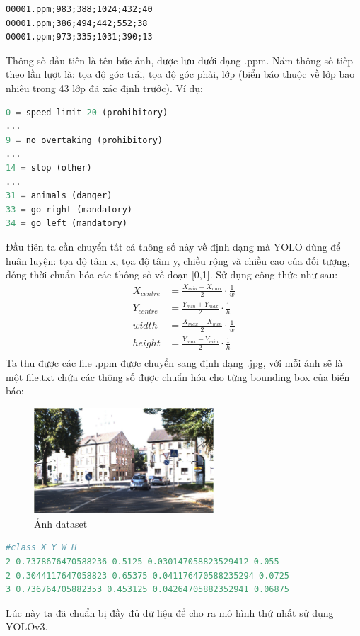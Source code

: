 \begin{lstlisting}
00001.ppm;983;388;1024;432;40
00001.ppm;386;494;442;552;38
00001.ppm;973;335;1031;390;13
\end{lstlisting}
Thông số đầu tiên là tên bức ảnh, được lưu dưới dạng .ppm. Năm thông số tiếp theo lần lượt là: tọa độ góc trái, tọa độ góc phải, lớp (biển báo thuộc về lớp bao nhiêu trong 43 lớp đã xác định trước). Ví dụ:
\begin{lstlisting}[language = Python]
0 = speed limit 20 (prohibitory)
...
9 = no overtaking (prohibitory)
...
14 = stop (other)
...
31 = animals (danger)
33 = go right (mandatory)
34 = go left (mandatory)

\end{lstlisting}
Đầu tiên ta cần chuyển tất cả thông số này về định dạng mà YOLO dùng để huân luyện: tọa độ tâm x, tọa độ tâm y, chiều rộng và chiều cao của đối tượng, đồng thời chuẩn hóa các thông số về đoạn [0,1]. Sử dụng công thức như sau:
\begin{equation*}
    \begin{aligned}
        X_{centre} &= \frac{X_{min} + X_{max} }{2} \cdot \frac{1}{w}\\
        Y_{centre} &= \frac{Y_{min} + Y_{max} }{2} \cdot \frac{1}{h}\\
        width &= \frac{X_{max} - X_{min} }{2} \cdot \frac{1}{w}\\
        height &= \frac{Y_{max} - Y_{min} }{2} \cdot \frac{1}{h}\\
    \end{aligned}
\end{equation*}
Ta thu được các file .ppm được chuyển sang định dạng .jpg, với mỗi ảnh sẽ là một file.txt chứa các thông số được chuẩn hóa cho từng bounding box của biển báo:
\begin{figure}[htbp]
    \centering
    \includegraphics[width = 0.6\textwidth]{images/2c-sign/00001.jpg}
    \caption{Ảnh dataset}
\end{figure}
\begin{lstlisting}[language = Python]
#class X Y W H
2 0.7378676470588236 0.5125 0.030147058823529412 0.055
2 0.3044117647058823 0.65375 0.041176470588235294 0.0725
3 0.736764705882353 0.453125 0.04264705882352941 0.06875
\end{lstlisting}
Lúc này ta đã chuẩn bị đầy đủ dữ liệu để cho ra mô hình thứ nhất sử dụng YOLOv3.

